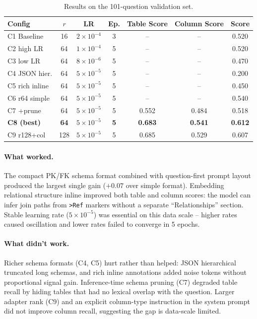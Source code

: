 \documentclass[11pt]{article}
\begin{document}
\begin{table}[h]
\centering\footnotesize
\caption{Results on the 101-question validation set.}
\label{tab:results}
\setlength{\tabcolsep}{5pt}
\begin{tabular}{l c c c c c c}
\toprule
\textbf{Config} & $r$ & \textbf{LR} & \textbf{Ep.} & \textbf{Table Score} & \textbf{Column Score} & \textbf{Score} \\
\midrule
C1 Baseline    & 16  & $2\times10^{-4}$ & 3 & --    & --    & 0.520 \\
C2 high LR     & 64  & $1\times10^{-4}$ & 5 & --    & --    & 0.520 \\
C3 low LR      & 64  & $8\times10^{-6}$ & 5 & --    & --    & 0.470 \\
C4 JSON hier.  & 64  & $5\times10^{-5}$ & 5 & --    & --    & 0.200 \\
C5 rich inline & 64  & $5\times10^{-5}$ & 5 & --    & --    & 0.450 \\
C6 r64 simple  & 64  & $5\times10^{-5}$ & 5 & --    & --    & 0.540 \\
C7 +prune      & 64  & $5\times10^{-5}$ & 5 & 0.552 & 0.484 & 0.518 \\
\textbf{C8 (best)} & \textbf{64} & $5\times10^{-5}$ & \textbf{5} & \textbf{0.683} & \textbf{0.541} & \textbf{0.612} \\
C9 r128+col    & 128 & $5\times10^{-5}$ & 5 & 0.685 & 0.529 & 0.607 \\
\bottomrule
\end{tabular}
\end{table}

\paragraph{What worked.}
The compact PK/FK schema format combined with question-first prompt layout produced the
largest single gain ($+0.07$ over simple format). Embedding relational structure inline
improved both table and column scores: the model can infer join paths from \texttt{>Ref}
markers without a separate ``Relationships'' section. Stable learning rate ($5\times10^{-5}$)
was essential on this data scale -- higher rates caused oscillation and lower rates failed to
converge in 5 epochs.

\paragraph{What didn't work.}
Richer schema formats (C4, C5) hurt rather than helped: JSON hierarchical truncated long
schemas, and rich inline annotations added noise tokens without proportional signal gain.
Inference-time schema pruning (C7) degraded table recall by hiding tables that had no
lexical overlap with the question. Larger adapter rank (C9) and an explicit column-type
instruction in the system prompt did not improve column recall, suggesting the gap is
data-scale limited.
\end{document}
